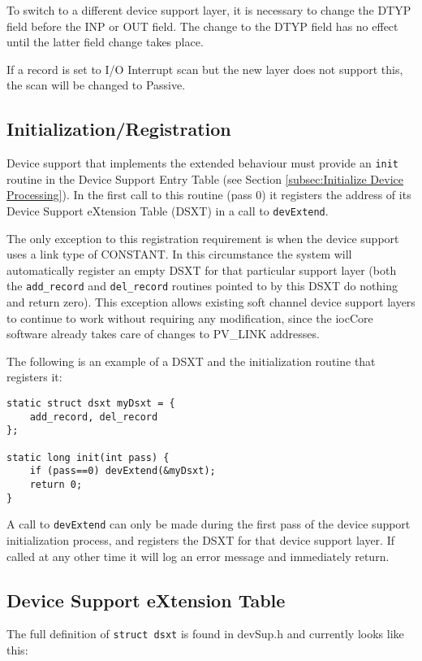 To switch to a different device support layer, it is necessary to change the DTYP field before the INP or OUT field.
The change to the DTYP field has no effect until the latter field change takes place.

If a record is set to I/O Interrupt scan but the new layer does not support this, the scan will be changed to Passive.

\subsection{Initialization/Registration}

Device support that implements the extended behaviour must provide an \verb|init| routine in the Device Support Entry Table (see Section \ref{subsec:Initialize Device Processing}).
In the first call to this routine (pass 0) it registers the address of its Device Support eXtension Table (DSXT) in a call to \verb|devExtend|.

The only exception to this registration requirement is when the device support uses a link type of CONSTANT.  In this 
circumstance the system will automatically register an empty DSXT for that particular support layer (both the 
\verb|add_record| and \verb|del_record| routines pointed to by this DSXT do nothing and return zero). This exception allows 
existing soft channel device support layers to continue to work without requiring any modification, since the iocCore 
software already takes care of changes to PV\_LINK addresses.

The following is an example of a DSXT and the initialization routine that registers it:

\begin{verbatim}
static struct dsxt myDsxt = {
    add_record, del_record
};

static long init(int pass) {
    if (pass==0) devExtend(&myDsxt);
    return 0;
}
\end{verbatim}

A call to \verb|devExtend| can only be made during the first pass of the device support initialization process, and registers the DSXT for that device support layer.
If called at any other time it will log an error message and immediately return.

\subsection{Device Support eXtension Table}

The full definition of \verb|struct dsxt| is found in devSup.h and currently looks like this:

